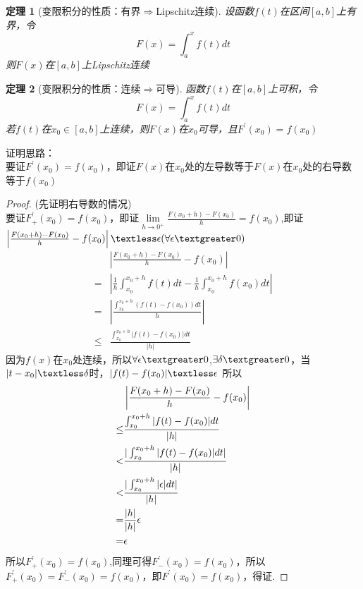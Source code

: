 \documentclass[12pt, a4paper, oneside]{ctexart}
\newtheorem{theorem}{定理}[section]
\begin{document}
\begin{theorem}[变限积分的性质：有界$\Rightarrow$Lipschitz连续]
设函数$f(t)$在区间$[a,b]$上有界，令
\begin{equation*}
    F(x)=\int_a^xf(t)dt
\end{equation*}
则$F(x)$在$[a,b]$上Lipschitz连续
\end{theorem}

\begin{theorem}[变限积分的性质：连续$\Rightarrow$可导]
函数$f(t)$在$[a,b]$上可积，令
\begin{equation*}
    F(x)=\int_a^{x}f(t)dt
\end{equation*}
若$f(t)$在$x_0\in[a,b]$上连续，则$F(x)$在$x_0$可导，且$F^{\prime}(x_0)=f(x_0)$
\end{theorem}

\begin{note}
证明思路：\\
要证$F^{\prime}(x_0)=f(x_0)$，即证$F(x)$在$x_0$处的左导数等于$F(x)$在$x_0$处的右导数等于$f(x_0)$
\end{note}

\begin{proof}
(先证明右导数的情况)\\
要证$F_{+}^{\prime}(x_0)=f(x_0)$，即证$\lim\limits_{h\to 0^+}\frac{F(x_0+h)-F(x_0)}{h}=f(x_0)$,即证$\left|\frac{F(x_0+h)-F(x_0)}{h}-f(x_0)\right|\textless \epsilon(\forall \epsilon \textgreater 0)$
\begin{equation*}
   \begin{aligned}
        &\left| \frac{F(x_0+h)-F(x_0)}{h}-f(x_0)   \right|\\
       =&\left|\frac{1}{h}\int_{x_0}^{x_0+h}f(t)dt-\frac{1}{h}\int_{x_0}^{x_0+h}f(x_0)dt\right|\\
       =&\left|\frac{\int_{x_0}^{x_0+h}(f(t)-f(x_0))dt}{h}     \right|\\
       \leq&\frac{\int_{x_0}^{x_0+h}|f(t)-f(x_0)|dt}{|h|}
   \end{aligned}
\end{equation*}
因为$f(x)$在$x_0$处连续，所以$\forall \epsilon \textgreater 0$,$\exists \delta \textgreater 0$，当$|t-x_0|\textless \delta$时，$|f(t)-f(x_0)|\textless \epsilon$
所以
\begin{equation*}
    \begin{aligned}
         &\left| \frac{F(x_0+h)-F(x_0)}{h}-f(x_0)   \right|\\
    \leq &\frac{\int_{x_0}^{x_0+h}|f(t)-f(x_0)|dt}{|h|}\\
    \textless &\frac{|\int_{x_0}^{x_0+h}|f(t)-f(x_0)|dt|}{|h|}\\
    \textless  &\frac{|\int_{x_0}^{x_0+h}|\epsilon|dt|}{|h|}\\
    =&\frac{|h|}{|h|}\epsilon\\
    =&\epsilon
    \end{aligned}
\end{equation*}
所以$F_{+}^{\prime}(x_0)=f(x_0)$,同理可得$F_{-}^{\prime}(x_0)=f(x_0)$，所以$F_{+}^{\prime}(x_0)=F_{-}^{\prime}(x_0)=f(x_0)$，即$F^{\prime}(x_0)=f(x_0)$，得证.
\end{proof}
\end{document}
